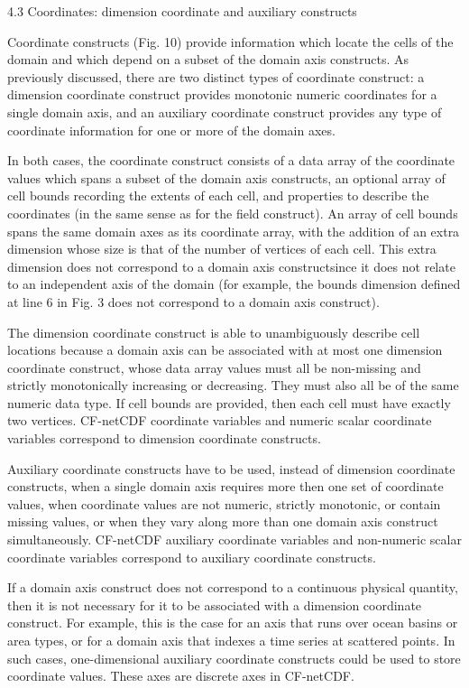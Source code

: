 4.3 Coordinates: dimension coordinate and auxiliary constructs

Coordinate constructs (Fig. 10) provide information which locate the
cells of the domain and which depend on a subset of the domain axis
constructs. As previously discussed, there are two distinct types of
coordinate construct: a dimension coordinate construct provides
monotonic numeric coordinates for a single domain axis, and an
auxiliary coordinate construct provides any type of coordinate
information for one or more of the domain axes.

In both cases, the coordinate construct consists of a data array of
the coordinate values which spans a subset of the domain axis
constructs, an optional array of cell bounds recording the extents of
each cell, and properties to describe the coordinates (in the same
sense as for the field construct). An array of cell bounds spans the
same domain axes as its coordinate array, with the addition of an
extra dimension whose size is that of the number of vertices of each
cell. This extra dimension does not correspond to a domain axis
constructsince it does not relate to an independent axis of the domain
(for example, the bounds dimension defined at line 6 in Fig. 3 does
not correspond to a domain axis construct).

The dimension coordinate construct is able to unambiguously describe
cell locations because a domain axis can be associated with at most
one dimension coordinate construct, whose data array values must all
be non-missing and strictly monotonically increasing or
decreasing. They must also all be of the same numeric data type. If
cell bounds are provided, then each cell must have exactly two
vertices. CF-netCDF coordinate variables and numeric scalar coordinate
variables correspond to dimension coordinate constructs.

Auxiliary coordinate constructs have to be used, instead of dimension
coordinate constructs, when a single domain axis requires more then
one set of coordinate values, when coordinate values are not numeric,
strictly monotonic, or contain missing values, or when they vary along
more than one domain axis construct simultaneously. CF-netCDF
auxiliary coordinate variables and non-numeric scalar coordinate
variables correspond to auxiliary coordinate constructs.

If a domain axis construct does not correspond to a continuous
physical quantity, then it is not necessary for it to be associated
with a dimension coordinate construct. For example, this is the case
for an axis that runs over ocean basins or area types, or for a domain
axis that indexes a time series at scattered points. In such cases,
one-dimensional auxiliary coordinate constructs could be used to store
coordinate values. These axes are discrete axes in CF-netCDF.

